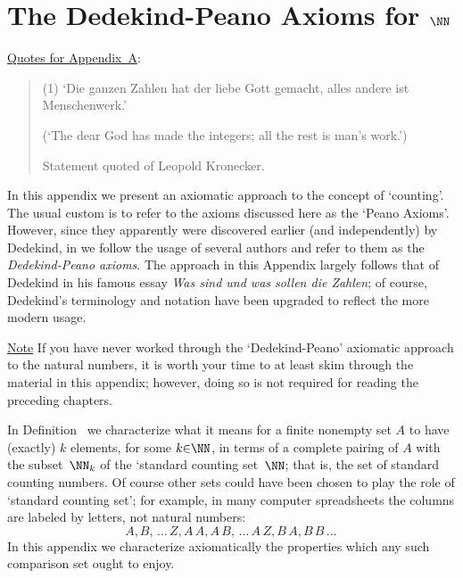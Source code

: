 
%
%


\appendix
                  \chapter{The Dedekind-Peano Axioms for ${\NN}$}

        \underline{Quotes for Appendix~A}:

\V

\begin{quotation}
{\footnotesize

              (1) `Die ganzen Zahlen hat der liebe Gott gemacht, alles andere ist Menschenwerk.'

        (`The dear God has made the integers; all the rest is man's work.')

        Statement quoted of Leopold Kronecker.

}%
\end{quotation}


\V
\V


        In this appendix we present an axiomatic approach to the concept of `counting'.
     The usual custom is to refer to the axioms discussed here as the `Peano Axioms'.
    However, since they apparently were discovered earlier (and independently) by Dedekind,
    in {\TheseNotes} we follow the usage of several authors and refer to them as the {\em Dedekind-Peano axioms}.
    The approach in this Appendix largely follows that of Dedekind in his famous essay {\em Was sind und was sollen die Zahlen};
    of course, Dedekind's terminology and notation have been upgraded to reflect the more modern usage.


        \underline{Note} If you have never worked through the `Dedekind-Peano' axiomatic approach to the natural numbers,
    it is worth your time to at least skim through the material in this appendix;
    however, doing so is not required for reading the preceding chapters.


\V
\V

        In Definition~ we characterize what it means for a finite nonempty set $A$ to have (exactly) $k$ elements, for some $k{\in}{\NN}$,
    in terms of a complete pairing of $A$ with the subset~${\NN}_{k}$ of the `standard counting set~${\NN}$; that is, the set of standard counting numbers.
    Of course other sets could have been chosen to play the role of `standard counting set';
    for example, in many computer spreadsheets the columns are labeled by letters, not natural numbers:
        \begin{displaymath}
        A, B, \,{\ldots}\,Z, A\,A, A\,B,\,{\ldots}\,A\,Z, B\,A, B\,B\,{\ldots}\,
        \end{displaymath}
    In this appendix we characterize axiomatically the properties which any such comparison set ought to enjoy.


